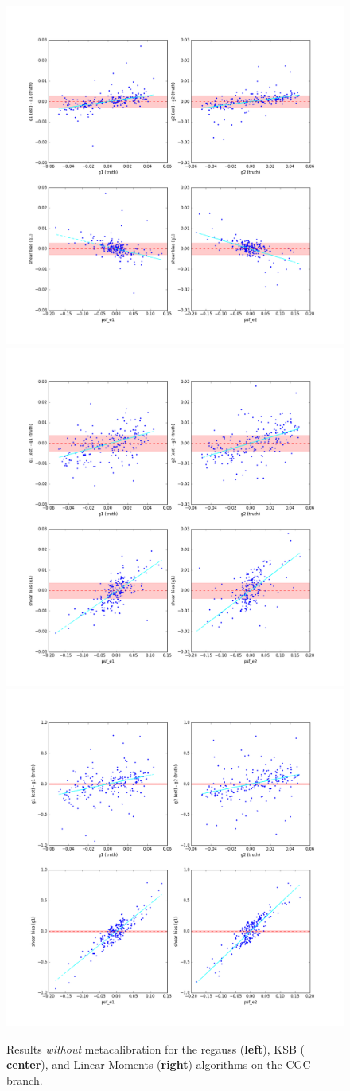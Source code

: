 \documentclass[iop]{emulateapj}
\begin{document}
\begin{figure}[t]
\includegraphics[width=0.32\linewidth]{./Plots/regauss-no_corrections.png}
\includegraphics[width=0.32\linewidth]{./Plots/ksb-no_corrections.png}
\includegraphics[width=0.32\linewidth]{./Plots/moments-no_corrections.png}
\caption{Results {\it without} metacalibration for the regauss ({\bf left}), KSB ({\bf
    center}), and Linear Moments ({\bf right}) algorithms on the CGC
  branch.}
\label{fig:cgc_uncorrected}
\end{figure}
\end{document}
